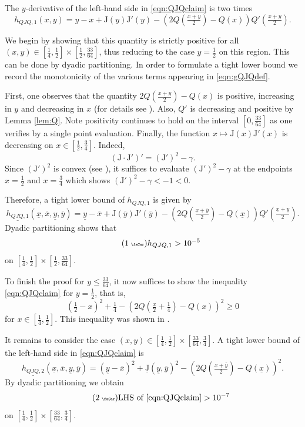 \documentclass[11pt]{amsart}
\theoremstyle{plain}
\newcommand{\auto}{\tag{\addtocounter{equation}{1}\theequation\;{\tiny\faCar}}}
\theoremstyle{definition}
\theoremstyle{remark}
\numberwithin{equation}{section}
\begin{document}
The $y$-derivative of the left-hand side in \eqref{eqn:QJQclaim} is two times
\begin{equation}\label{eqn:gQJQdef}
h_{QJQ,1}(x,y)=y-x +{\mathrm{J}}(y){\mathrm{J}}'(y)-(2Q(\tfrac{x+y}{2})-Q(x))Q'(\tfrac{x+y}{2}).
\end{equation}

We begin by showing that this quantity is strictly positive for all $(x,y)\in [\frac14,\frac12]\times [\frac{1}{2},\frac{33}{64}]$, thus reducing to the case $y=\frac12$ on this region.
This can be done by dyadic partitioning. In order to formulate a tight lower bound we record the monotonicity of the various terms appearing in \eqref{eqn:gQJQdef}.

First, one observes that the quantity $2Q(\frac{x+y}2)-Q(x)$ is positive, increasing in $y$ and decreasing in $x$ (for details see \cite[\S 6.5]{DIR24}). Also, $Q'$ is decreasing and positive by Lemma \ref{lem:Q}. Note positivity continues to hold on the interval $[0,\tfrac{33}{64}]$ as one verifies by a single point evaluation.
Finally, the function $x\mapsto {\mathrm{J}}(x){\mathrm{J}}'(x)$ is decreasing on $x\in [\frac12, \frac34]$. Indeed, \[({\mathrm{J}}\cdot {\mathrm{J}}')' = ({\mathrm{J}}')^2-\gamma.\]
Since $({\mathrm{J}}')^2$ is convex (see \cite[Lemma 3.2]{DIR24}), it suffices to evaluate $({\mathrm{J}}')^2-\gamma$ at the endpoints $x=\frac12$ and $x=\frac34$ which shows $({\mathrm{J}}')^2-\gamma<-1<0$.

Therefore, a tight lower bound of $h_{QJQ,1}$ is given by
\[ \underline{h_{QJQ,1}}(\underline{x},\overline{x},\underline{y},\overline{y}) = \underline{y}-\overline{x} + {\mathrm{J}}(\overline{y}){\mathrm{J}}'(\overline{y}) - (2Q(\tfrac{\underline{x}+\overline{y}}2)-Q(\underline{x}))Q'(\tfrac{\underline{x}+\underline{y}}2). \]
Dyadic partitioning shows that
\begin{equation}\label{eqn:h_QJQ_1_auto}\auto h_{QJQ,1}>10^{-5}
\end{equation}
on $[\frac14,\frac12]\times [\frac{1}{2},\frac{33}{64}]$.

To finish the proof for $y\le \frac{33}{64}$, it now suffices to show the inequality \eqref{eqn:QJQclaim} for $y=\frac12$, that is,
\[(\tfrac{1}{2}-x)^2 + \tfrac{1}{4} - (2Q(\tfrac{x}{2} + \tfrac{1}{4})-Q(x))^2 \ge 0 \]
for $x\in [\frac14,\frac12]$.
This inequality was shown in \cite[\S 6.5]{DIR24}.

It remains to consider the case $(x,y)\in [\frac{1}{4},\frac{1}{2}]\times [\tfrac{33}{64},\tfrac{3}{4}]$. A tight lower bound of the left-hand side in \eqref{eqn:QJQclaim} is
\[\underline{h_{QJQ,2}}(\underline x,\overline x, \underline y, \overline y)=(\underline{y}-\overline{x})^2 + \underline{{\mathrm{J}}}(\underline y, \overline{y})^2 - (2Q(\tfrac{\underline{x}+\overline{y}}{2})-Q(\underline{x}))^2.\]
By dyadic partitioning we obtain
\begin{equation}\label{eqn:h_QJQ_2_auto}\auto \text{LHS of }\eqref{eqn:QJQclaim}>10^{-7}
\end{equation}
on $[\frac14,\frac12]\times [\tfrac{33}{64},\tfrac{3}{4}]$.
\end{document}
